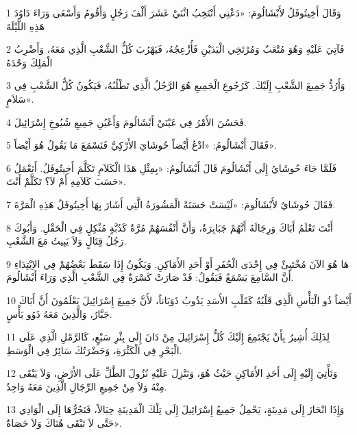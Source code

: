 \par 1 وَقَالَ أَخِيتُوفَلُ لأَبْشَالُومَ: «دَعْنِي أَنْتَخِبُ اثْنَيْ عَشَرَ أَلْفَ رَجُلٍ وَأَقُومُ وَأَسْعَى وَرَاءَ دَاوُدَ هَذِهِ اللَّيْلَةَ
\par 2 فَآتِيَ عَلَيْهِ وَهُوَ مُتْعَبٌ وَمُرْتَخِي الْيَدَيْنِ فَأُزْعِجُهُ، فَيَهْرُبَ كُلُّ الشَّعْبِ الَّذِي مَعَهُ، وَأَضْرِبُ الْمَلِكَ وَحْدَهُ
\par 3 وَأَرُدُّ جَمِيعَ الشَّعْبِ إِلَيْكَ. كَرُجُوعِ الْجَمِيعِ هُوَ الرَّجُلُ الَّذِي تَطْلُبُهُ، فَيَكُونُ كُلُّ الشَّعْبِ فِي سَلاَمٍ».
\par 4 فَحَسُنَ الأَمْرُ فِي عَيْنَيْ أَبْشَالُومَ وَأَعْيُنِ جَمِيعِ شُيُوخِ إِسْرَائِيلَ.
\par 5 فَقَالَ أَبْشَالُومُ: «ادْعُ أَيْضاً حُوشَايَ الأَرْكِيَّ فَنَسْمَعَ مَا يَقُولُ هُوَ أَيْضاً».
\par 6 فَلَمَّا جَاءَ حُوشَايُ إِلَى أَبْشَالُومَ قَالَ أَبْشَالُومُ: «بِمِثْلِ هَذَا الْكَلاَمِ تَكَلَّمَ أَخِيتُوفَلُ. أَنَعْمَلُ حَسَبَ كَلاَمِهِ أَمْ لاَ؟ تَكَلَّمْ أَنْتَ».
\par 7 فَقَالَ حُوشَايُ لأَبْشَالُومَ: «لَيْسَتْ حَسَنَةً الْمَشُورَةُ الَّتِي أَشَارَ بِهَا أَخِيتُوفَلُ هَذِهِ الْمَرَّةَ.
\par 8 أَنْتَ تَعْلَمُ أَبَاكَ وَرِجَالَهُ أَنَّهُمْ جَبَابِرَةٌ، وَأَنَّ أَنْفُسَهُمْ مُرَّةٌ كَدُبَّةٍ مُثْكِلٍ فِي الْحَقْلِ. وَأَبُوكَ رَجُلُ قِتَالٍ وَلاَ يَبِيتُ مَعَ الشَّعْبِ.
\par 9 هَا هُوَ الآنَ مُخْتَبِئٌ فِي إِحْدَى الْحُفَرِ أَوْ أَحَدِ الأَمَاكِنِ. وَيَكُونُ إِذَا سَقَطَ بَعْضُهُمْ فِي الاِبْتِدَاءِ أَنَّ السَّامِعَ يَسْمَعُ فَيَقُولُ: قَدْ صَارَتْ كَسْرَةٌ فِي الشَّعْبِ الَّذِي وَرَاءَ أَبْشَالُومَ.
\par 10 أَيْضاً ذُو الْبَأْسِ الَّذِي قَلْبُهُ كَقَلْبِ الأَسَدِ يَذُوبُ ذَوَبَاناً، لأَنَّ جَمِيعَ إِسْرَائِيلَ يَعْلَمُونَ أَنَّ أَبَاكَ جَبَّارٌ، وَالَّذِينَ مَعَهُ ذَوُو بَأْسٍ.
\par 11 لِذَلِكَ أُشِيرُ بِأَنْ يَجْتَمِعَ إِلَيْكَ كُلُّ إِسْرَائِيلَ مِنْ دَانَ إِلَى بِئْرِ سَبْعٍ، كَالرَّمْلِ الَّذِي عَلَى الْبَحْرِ فِي الْكَثْرَةِ، وَحَضْرَتُكَ سَائِرٌ فِي الْوَسَطِ.
\par 12 وَنَأْتِيَ إِلَيْهِ إِلَى أَحَدِ الأَمَاكِنِ حَيْثُ هُوَ، وَنَنْزِلَ عَلَيْهِ نُزُولَ الطَّلِّ عَلَى الأَرْضِ، وَلاَ يَبْقَى مِنْهُ وَلاَ مِنْ جَمِيعِ الرِّجَالِ الَّذِينَ مَعَهُ وَاحِدٌ.
\par 13 وَإِذَا انْحَازَ إِلَى مَدِينَةٍ، يَحْمِلُ جَمِيعُ إِسْرَائِيلَ إِلَى تِلْكَ الْمَدِينَةِ حِبَالاً، فَنَجُرُّهَا إِلَى الْوَادِي حَتَّى لاَ تَبْقَى هُنَاكَ وَلاَ حَصَاةٌ».
